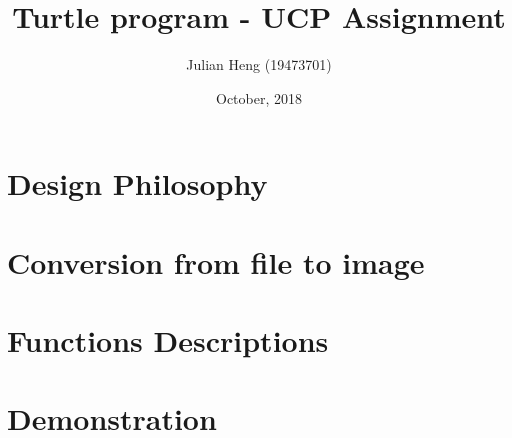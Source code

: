 \documentclass[a4paper, 10pt, titlepage]{article}
\title{\huge Turtle program - UCP Assignment}
\author{Julian Heng (19473701)}
\date{October, 2018}
\begin{document}
\maketitle
\tableofcontents
\newpage

\section{Design Philosophy}

\newpage


\section{Conversion from file to image}

\newpage


\section{Functions Descriptions}

\newpage


\section{Demonstration}

\newpage
\end{document}
